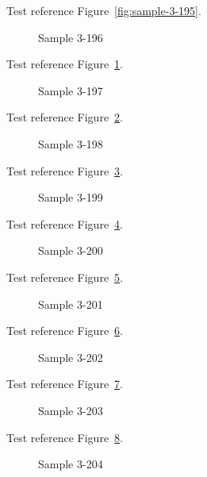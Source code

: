 Test reference Figure~\ref{fig:sample-3-195}.

\begin{figure}[tbhp]
\caption{Sample 3-196}
\label{fig:sample-3-196}
\end{figure}

Test reference Figure~\ref{fig:sample-3-196}.

\begin{figure}[tbhp]
\caption{Sample 3-197}
\label{fig:sample-3-197}
\end{figure}

Test reference Figure~\ref{fig:sample-3-197}.

\begin{figure}[tbhp]
\caption{Sample 3-198}
\label{fig:sample-3-198}
\end{figure}

Test reference Figure~\ref{fig:sample-3-198}.

\begin{figure}[tbhp]
\caption{Sample 3-199}
\label{fig:sample-3-199}
\end{figure}

Test reference Figure~\ref{fig:sample-3-199}.

\begin{figure}[tbhp]
\caption{Sample 3-200}
\label{fig:sample-3-200}
\end{figure}

Test reference Figure~\ref{fig:sample-3-200}.

\begin{figure}[tbhp]
\caption{Sample 3-201}
\label{fig:sample-3-201}
\end{figure}

Test reference Figure~\ref{fig:sample-3-201}.

\begin{figure}[tbhp]
\caption{Sample 3-202}
\label{fig:sample-3-202}
\end{figure}

Test reference Figure~\ref{fig:sample-3-202}.

\begin{figure}[tbhp]
\caption{Sample 3-203}
\label{fig:sample-3-203}
\end{figure}

Test reference Figure~\ref{fig:sample-3-203}.

\begin{figure}[tbhp]
\caption{Sample 3-204}
\label{fig:sample-3-204}
\end{figure}

